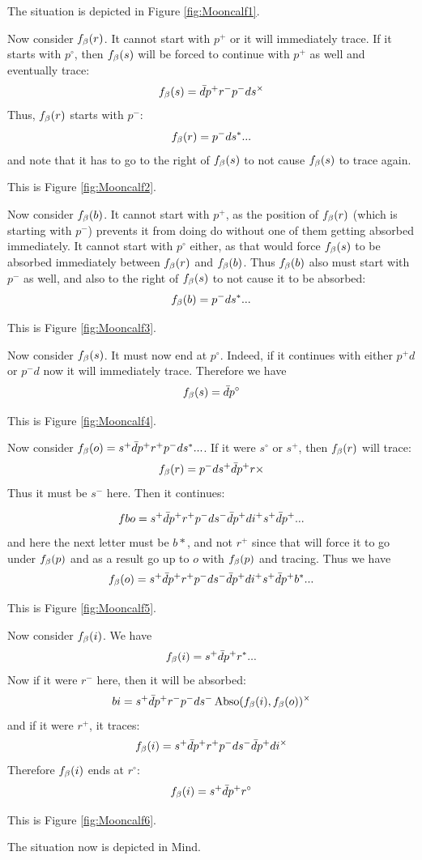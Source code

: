 The situation is depicted in Figure \ref{fig:Mooncalf1}.

Now consider $f_\beta(r)$. It cannot start with $p^+$ or it will immediately trace. If it starts with $p^\circ$, then $f_\beta(s)$ will be forced to continue with $p^+$ as well and eventually trace:
\[
f_\beta(s) = \bar{d} p^+ r^- p^- d s^\times
\]
Thus, $f_\beta(r)$ starts with $p^-$:
\[
f_\beta(r) = p^- d s^*...
\]
and note that it has to go to the right of $f_\beta(s)$ to not cause $f_\beta(s)$ to trace again.

This is Figure \ref{fig:Mooncalf2}.

Now consider $f_\beta(b)$. It cannot start with $p^+$, as the position of $f_\beta(r)$ (which is starting with $p^-$) prevents it from doing do without one of them getting absorbed immediately. It cannot start with $p^\circ$ either, as that would force $f_\beta(s)$ to be absorbed immediately between $f_\beta(r)$ and $f_\beta(b)$. Thus $f_\beta(b)$ also must start with $p^-$ as well, and also to the right of $f_\beta(s)$ to not cause it to be absorbed:
\[
f_\beta(b) = p^- d s^*...
\]

This is Figure \ref{fig:Mooncalf3}.

Now consider $f_\beta(s)$. It must now end at $p^\circ$. Indeed, if it continues with either $p^+ d$ or $p^- d$ now it will immediately trace. Therefore we have
\[
f_\beta(s) = \bar{d} p^\circ
\]

This is Figure \ref{fig:Mooncalf4}.

Now consider $f_\beta(o) = s^+ \bar{d} p^+ r^+ p^- d s^*...$. If it were $s^\circ$ or $s^+$, then $f_\beta(r)$ will trace:
\[
f_\beta(r) = p^- d s^+ \bar{d} p^+ r\times
\]
Thus it must be $s^-$ here. Then it continues:

\[
fbo = s^+ \bar{d} p^+ r^+ p^- d s^- \bar{d} p^+ d i^+ s^+ \bar{d} p^+...
\]
and here the next letter must be $b*$, and not $r^+$ since that will force it to go under $f_\beta(p)$ and as a result go up to $o$ with $f_\beta(p)$ and tracing. Thus we have
\[
f_\beta(o) = s^+ \bar{d} p^+ r^+ p^- d s^- \bar{d} p^+ d i^+ s^+ \bar{d} p^+ b^*...
\]

This is Figure \ref{fig:Mooncalf5}.

Now consider $f_\beta(i)$. We have
\[
f_\beta(i) = s^+ \bar{d} p^+ r^*...
\]
Now if it were $r^-$ here, then it will be absorbed:
\[
bi = s^+ \bar{d} p^+ r^- p^- d s^- \operatorname{Abso}(f_\beta(i), f_\beta(o))^\times
\]
and if it were $r^+$, it traces:
\[
f_\beta(i) = s^+ \bar{d} p^+ r^+ p^- d s^- \bar{d} p^+ d i^\times
\]
Therefore $f_\beta(i)$ ends at $r^\circ$:
\[
f_\beta(i) = s^+ \bar{d} p^+ r^\circ
\]

This is Figure \ref{fig:Mooncalf6}.

The situation now is depicted in Mind.

